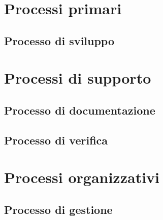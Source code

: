\documentclass[a4paper,titlepage]{article}
\begin{document}
\newpage

\tableofcontents



\section{Processi primari} 
\label{sec:2}
	\subsection{Processo di sviluppo}
	\label{sec:2.1}
		
		
\section{Processi di supporto}
\label{sec:3}
	\subsection{Processo di documentazione}
	\label{sec:3.1}
		
	\subsection{Processo di verifica}
	\label{sec:3.2}
		

\section{Processi organizzativi}
\label{sec:4}
	\subsection{Processo di gestione}
	\label{sec:4.1}
		
\end{document}
